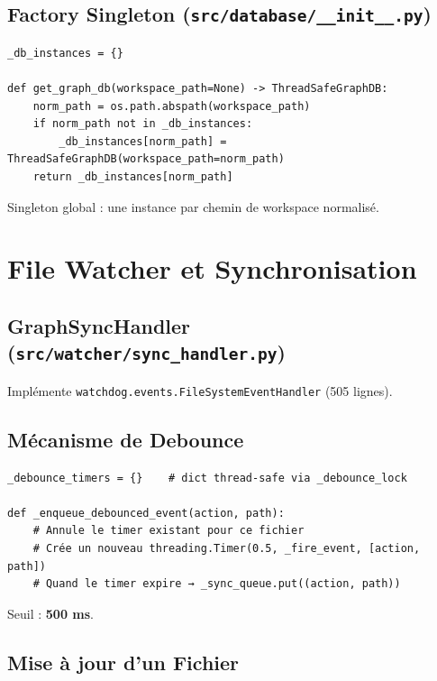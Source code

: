 \documentclass[12pt,a4paper]{article}
\newcommand{\code}[1]{\texttt{#1}}
\begin{document}
\subsection{Factory Singleton (\code{src/database/\_\_init\_\_.py})}

\begin{verbatim}
_db_instances = {}

def get_graph_db(workspace_path=None) -> ThreadSafeGraphDB:
    norm_path = os.path.abspath(workspace_path)
    if norm_path not in _db_instances:
        _db_instances[norm_path] = ThreadSafeGraphDB(workspace_path=norm_path)
    return _db_instances[norm_path]
\end{verbatim}

Singleton global : une instance par chemin de workspace normalisé.

\section{File Watcher et Synchronisation}

\subsection{GraphSyncHandler (\code{src/watcher/sync\_handler.py})}

Implémente \code{watchdog.events.FileSystemEventHandler} (505 lignes).

\subsection{Mécanisme de Debounce}

\begin{verbatim}
_debounce_timers = {}    # dict thread-safe via _debounce_lock

def _enqueue_debounced_event(action, path):
    # Annule le timer existant pour ce fichier
    # Crée un nouveau threading.Timer(0.5, _fire_event, [action, path])
    # Quand le timer expire → _sync_queue.put((action, path))
\end{verbatim}

Seuil : \textbf{500 ms}.

\subsection{Mise à jour d'un Fichier}
\end{document}
